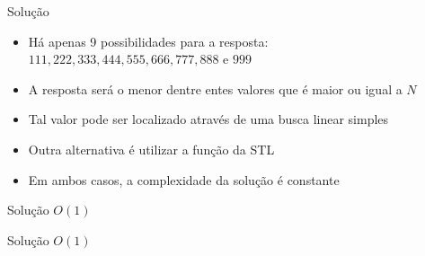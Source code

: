 \begin{frame}[fragile]{Solução}

    \begin{itemize}
        \item Há apenas 9 possibilidades para a resposta: $111, 222, 333, 444, 555, 666, 777,
            888$ e $999$

        \item A resposta será o menor dentre entes valores que é maior ou igual a $N$

        \item Tal valor pode ser localizado através de uma busca linear simples

        \item Outra alternativa é utilizar a função  da STL

        \item Em ambos casos, a complexidade da solução é constante
    \end{itemize}

\end{frame}

\begin{frame}[fragile]{Solução $O(1)$}
\end{frame}

\begin{frame}[fragile]{Solução $O(1)$}
\end{frame}
